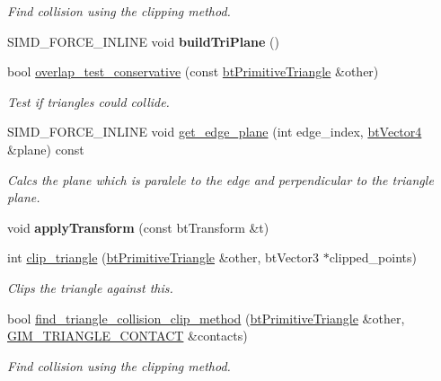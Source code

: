 \begin{DoxyCompactItemize}
\begin{DoxyCompactList}\small\item\em Find collision using the clipping method. \end{DoxyCompactList}\item 
\mbox{\label{classbtPrimitiveTriangle_af744acb5a8197dd9154b9707fef252cc}} 
S\+I\+M\+D\+\_\+\+F\+O\+R\+C\+E\+\_\+\+I\+N\+L\+I\+NE void {\bfseries build\+Tri\+Plane} ()
\item 
\mbox{\label{classbtPrimitiveTriangle_a844b5c15a34e656e64135f43a8d27d53}} 
bool \hyperlink{classbtPrimitiveTriangle_a844b5c15a34e656e64135f43a8d27d53}{overlap\+\_\+test\+\_\+conservative} (const \hyperlink{classbtPrimitiveTriangle}{bt\+Primitive\+Triangle} \&other)
\begin{DoxyCompactList}\small\item\em Test if triangles could collide. \end{DoxyCompactList}\item 
S\+I\+M\+D\+\_\+\+F\+O\+R\+C\+E\+\_\+\+I\+N\+L\+I\+NE void \hyperlink{classbtPrimitiveTriangle_a44c4e264a4aa6b92a1188743555f1c92}{get\+\_\+edge\+\_\+plane} (int edge\+\_\+index, \hyperlink{classbtVector4}{bt\+Vector4} \&plane) const
\begin{DoxyCompactList}\small\item\em Calcs the plane which is paralele to the edge and perpendicular to the triangle plane. \end{DoxyCompactList}\item 
\mbox{\label{classbtPrimitiveTriangle_ab896f319c6d779b5028090df42432cf9}} 
void {\bfseries apply\+Transform} (const bt\+Transform \&t)
\item 
int \hyperlink{classbtPrimitiveTriangle_a56e930410f18f866e47431ed77c6c3ca}{clip\+\_\+triangle} (\hyperlink{classbtPrimitiveTriangle}{bt\+Primitive\+Triangle} \&other, bt\+Vector3 $\ast$clipped\+\_\+points)
\begin{DoxyCompactList}\small\item\em Clips the triangle against this. \end{DoxyCompactList}\item 
bool \hyperlink{classbtPrimitiveTriangle_a24c4903aecd95c2d11bbc42ba3df0e66}{find\+\_\+triangle\+\_\+collision\+\_\+clip\+\_\+method} (\hyperlink{classbtPrimitiveTriangle}{bt\+Primitive\+Triangle} \&other, \hyperlink{structGIM__TRIANGLE__CONTACT}{G\+I\+M\+\_\+\+T\+R\+I\+A\+N\+G\+L\+E\+\_\+\+C\+O\+N\+T\+A\+CT} \&contacts)
\begin{DoxyCompactList}\small\item\em Find collision using the clipping method. \end{DoxyCompactList}\end{DoxyCompactItemize}

